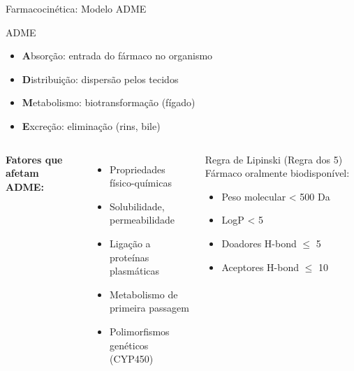 \begin{frame}{Farmacocinética: Modelo ADME}
\begin{block}{ADME}
\begin{itemize}
    \item \textbf{A}bsorção: entrada do fármaco no organismo
    \item \textbf{D}istribuição: dispersão pelos tecidos
    \item \textbf{M}etabolismo: biotransformação (fígado)
    \item \textbf{E}xcreção: eliminação (rins, bile)
\end{itemize}
\end{block}

\vspace{0.3cm}

\begin{columns}
\textbf{Fatores que afetam ADME:}
\begin{itemize}
    \item Propriedades físico-químicas
    \item Solubilidade, permeabilidade
    \item Ligação a proteínas plasmáticas
    \item Metabolismo de primeira passagem
    \item Polimorfismos genéticos (CYP450)
\end{itemize}

\begin{alertblock}{Regra de Lipinski (Regra dos 5)}
Fármaco oralmente biodisponível:
\begin{itemize}
    \item Peso molecular < 500 Da
    \item LogP < 5
    \item Doadores H-bond $\leq$ 5
    \item Aceptores H-bond $\leq$ 10
\end{itemize}
\end{alertblock}
\end{columns}
\end{frame}

